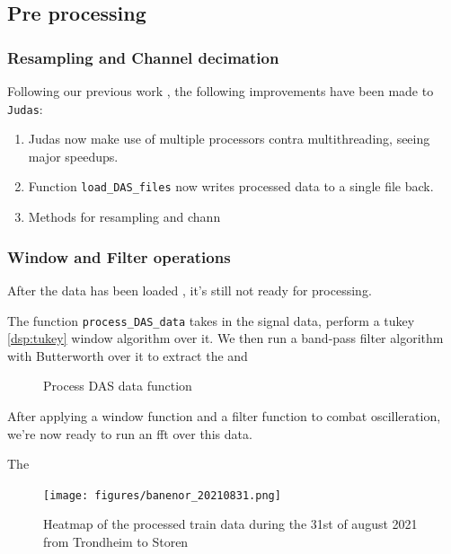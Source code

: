 \subsection{Pre processing}

\subsubsection{Resampling and Channel decimation}

Following our previous work \cite{projthesis}, the following improvements have been made to \texttt{Judas}: 

\begin{enumerate}
    \item Judas now make use of multiple processors contra multithreading, seeing major speedups.
    \item Function \texttt{load\_DAS\_files} now writes processed data to a single file back.
    \item Methods for resampling and chann
\end{enumerate}


\subsubsection{Window and Filter operations}

After the data has been loaded \cite{projthesis}, it's still not ready for processing. 

The function \lstinline|process_DAS_data| takes in the signal data, perform a tukey \ref{dsp:tukey} window algorithm over it. We then run a band-pass filter algorithm with Butterworth over it to extract the and 

\begin{figure}[h]
    \centering
    
    \caption{Process DAS data function}
    \label{fig:procdasdata}
\end{figure}


After applying a window function and a filter function to combat oscilleration, we're now ready to run an fft over this data. 


The 

\begin{figure}[h]
    \centering
    \texttt{[image: figures/banenor\_20210831.png]}
    \caption{Heatmap of the processed train data during the 31st of august 2021 from Trondheim to Storen}
    \label{fig:trdstrdas}
\end{figure}

